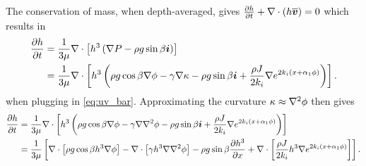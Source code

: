 The conservation of mass, when depth-averaged, gives 
$\frac{\partial h}{\partial t} + \nabla \cdot \left( h\overline{\boldsymbol{v}} \right) = 0$
which results in 
\begin{align}
    \begin{aligned}
    \frac{\partial h}{\partial t} &= \frac{1}{3\mu} \nabla \cdot \left[ h^3 \left( \nabla P - \rho g \sin \beta \boldsymbol{i} \right) \right]\\
    &= \frac{1}{3\mu} \nabla \cdot \left[ h^3 \left( \rho g \cos\beta \nabla \phi - \gamma\nabla\kappa - \rho g \sin \beta \boldsymbol{i} + \frac{\rho J}{2k_i}\nabla e^{2k_i \left( x + \alpha_1 \phi \right)}  \right) \right]. 
    \end{aligned}
    \label{eq:thin_film_nokappa}
\end{align}
when plugging in \cref{eq:uv_bar}. Approximating the curvature $\kappa \approx \nabla^2 \phi$ then gives 
\begin{align}
    \begin{aligned}
    \frac{\partial h}{\partial t} &= \frac{1}{3\mu} \nabla \cdot \left[ h^3 \left( \rho g \cos\beta \nabla \phi - \gamma\nabla\nabla^2\phi - \rho g \sin \beta \boldsymbol{i} + \frac{\rho J}{2k_i}\nabla e^{2k_i \left( x + \alpha_1 \phi \right)} \right) \right]\\
    &= \frac{1}{3\mu} \left[  \nabla \cdot \left[ \rho g \cos \beta h^3 \nabla \phi \right] - \nabla \cdot \left[ \gamma h^3 \nabla\nabla^2\phi \right] - \rho g \sin\beta \frac{\partial h^3}{\partial x} + \nabla \cdot \left[ \frac{\rho J}{2k_i}h^3\nabla e^{2k_i \left( x + \alpha_1 \phi \right)} \right] \right].
    \end{aligned}
    \label{eq:thin_film_dim}
\end{align}

